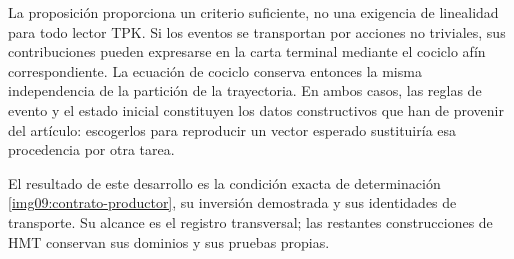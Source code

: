 La proposición proporciona un criterio suficiente, no una exigencia de
linealidad para todo lector TPK. Si los eventos se transportan por acciones
no triviales, sus contribuciones pueden expresarse en la carta terminal
mediante el cociclo afín correspondiente. La ecuación de cociclo conserva
entonces la misma independencia de la partición de la trayectoria.
En ambos casos, las reglas de evento y el estado inicial constituyen los
datos constructivos que han de provenir del artículo: escogerlos para
reproducir un vector esperado sustituiría esa procedencia por otra tarea.

El resultado de este desarrollo es la condición exacta de determinación
\eqref{img09:contrato-productor}, su inversión demostrada y sus identidades
de transporte. Su alcance es el registro transversal; las restantes
construcciones de HMT conservan sus dominios y sus pruebas propias.
